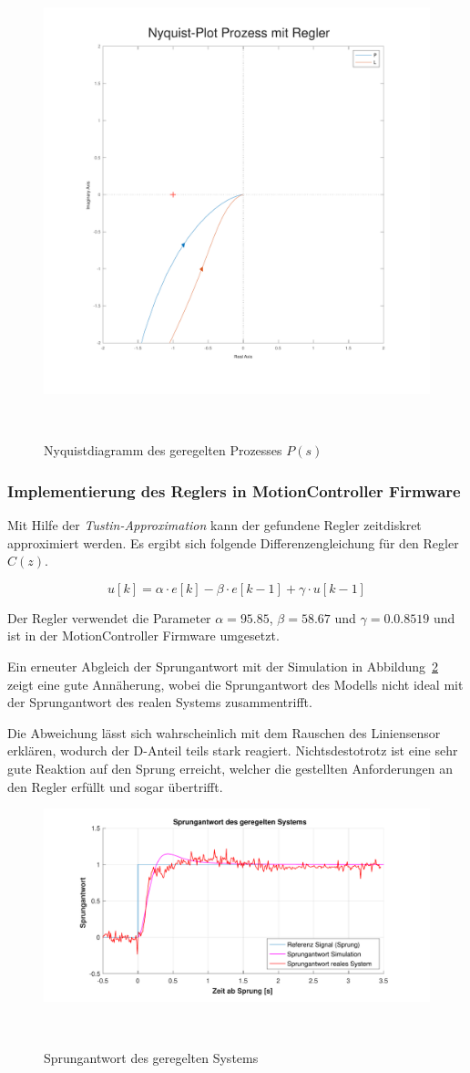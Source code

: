 \documentclass[main.tex]{subfiles} %
\begin{document}
\begin{figure}[H]
    \centering
    \includegraphics[width=0.75\linewidth]{fig_Parametrierung_Linienfolgeregler/NyquistPlot_System_geregelt.pdf}
    \caption{Nyquistdiagramm des geregelten Prozesses $P(s)$}~\label{fig:Nyquist_geregelt}
\end{figure}

\subsubsection*{Implementierung des Reglers in MotionController Firmware}

Mit Hilfe der \textit{Tustin-Approximation} kann der gefundene Regler
zeitdiskret approximiert werden. Es ergibt sich folgende Differenzengleichung
für den Regler $C(z)$.

\[
    u[k] = \alpha \cdot e[k] - \beta \cdot e[k - 1] + \gamma \cdot u[k - 1]
\]

Der Regler verwendet die Parameter $\alpha = 95.85$, $\beta = 58.67$ und
$\gamma = 0.0.8519$ und ist in der MotionController Firmware umgesetzt.

Ein erneuter Abgleich der Sprungantwort mit der Simulation in
Abbildung~\ref{fig:Sprung_geregelt} zeigt eine gute Annäherung, wobei die
Sprungantwort des Modells nicht ideal mit der Sprungantwort des realen Systems
zusammentrifft.

Die Abweichung lässt sich wahrscheinlich mit dem Rauschen des Liniensensor
erklären, wodurch der D-Anteil teils stark reagiert. Nichtsdestotrotz ist eine
sehr gute Reaktion auf den Sprung erreicht, welcher die gestellten
Anforderungen an den Regler erfüllt und sogar übertrifft.

\begin{figure}[H]
    \centering
    \includegraphics[width=1\linewidth]{fig_Parametrierung_Linienfolgeregler/Sprungantwort_System_kontrolle.pdf}
    \caption{Sprungantwort des geregelten Systems}~\label{fig:Sprung_geregelt}
\end{figure}
\end{document}
